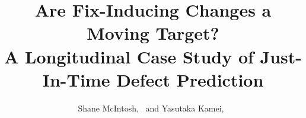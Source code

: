 

\newcommand{\rqi}{Do JIT models lose predictive power over time?}
\newcommand{\rqii}{Does the relationship between code change properties and the likelihood of inducing a fix evolve?}
\newcommand{\rqiii}{How accurately do current importance scores of code change properties represent future ones?}

\newcommand{\conjecture}{%
\vspace{0.1mm}
\begin{center}
\parbox[b]{0.4\textwidth}{%
 \centering
{\em Do the important properties of fix-inducing \\
changes remain consistent as systems evolve?}
}
\end{center}
\vspace{0.1mm}
}



\title{Are Fix-Inducing Changes a Moving Target?\\
{\LARGE A Longitudinal Case Study of Just-In-Time Defect Prediction}}

\author{Shane McIntosh,~
 and Yasutaka Kamei,~%
}

